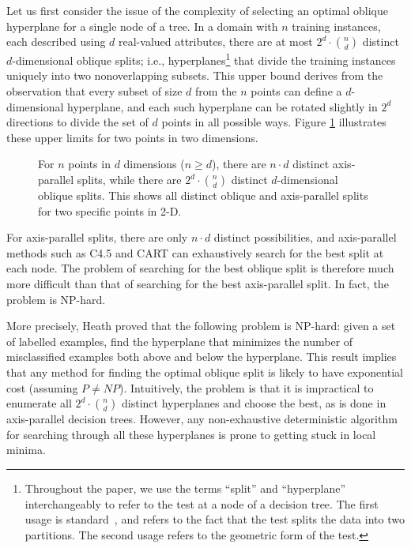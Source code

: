 Let us first consider the issue of the complexity of selecting an
optimal oblique hyperplane for a single node of a tree.  In a domain
with $n$ training instances, each described using $d$ real-valued
attributes, there are at most $2^d \cdot {n \choose d}$ distinct
$d$-dimensional oblique splits; i.e., hyperplanes\footnote{Throughout
the paper, we use the terms ``split'' and ``hyperplane''
interchangeably to refer to the test at a node of a decision tree.
The first usage is standard~\cite{moret/82}, and refers to the fact
that the test splits the data into two partitions.  The second usage
refers to the geometric form of the test.} that divide the training
instances uniquely into two nonoverlapping subsets.  This upper bound
derives from the observation that every subset of size $d$ from the
$n$ points can define a $d$-dimensional hyperplane, and each such
hyperplane can be rotated slightly in $2^d$ directions to divide the 
set of $d$ points in all possible ways.  Figure \ref{figure:upperlimit}
illustrates these upper limits for two points in two dimensions.
\begin{figure}
\vspace{3.1in}
\caption{For $n$ points in $d$ dimensions ($n \geq d$), 
there are $n \cdot d$ distinct axis-parallel splits, while
there are $2^d \cdot {n \choose d}$ distinct
$d$-dimensional oblique splits.  This shows all distinct oblique
and axis-parallel splits for two specific points in 2-D.}
\label{figure:upperlimit}
\vspace*{-.2in} 
\end{figure}
For axis-parallel splits, there are only $n \cdot d$ distinct
possibilities, and axis-parallel methods such as C4.5
\cite{quinlan/93} and CART \cite{breiman/etal/84} can exhaustively 
search for the best split at each node.  The problem of searching for
the best oblique split is therefore much more difficult than that of
searching for the best axis-parallel split.  In fact, the problem is
NP-hard.

More precisely, Heath \citeyear{heath/92} proved that the following
problem is NP-hard: given a set of labelled examples, find the
hyperplane that minimizes the number of misclassified examples both
above and below the hyperplane.  This result implies that any method
for finding the optimal oblique split is likely to have exponential
cost (assuming $P \neq NP$).  Intuitively, the problem is that it is
impractical to enumerate all $2^d \cdot {n \choose d}$ distinct
hyperplanes and choose the best, as is done in axis-parallel decision
trees.  However, any non-exhaustive deterministic algorithm for
searching through all these hyperplanes is prone to getting stuck in
local minima.

